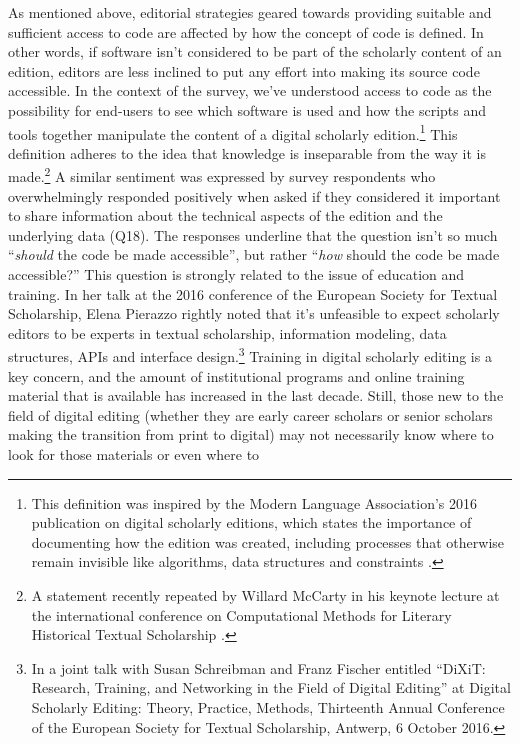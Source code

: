 \begin{paper}
As mentioned above, editorial strategies geared towards providing
suitable and sufficient access to code are affected by how the concept
of code is defined. In other words, if software isn't considered to be
part of the scholarly content of an edition, editors are less inclined
to put any effort into making its source code accessible. In the context
of the survey, we've understood access to code as the possibility for
end-users to see which software is used and how the scripts and tools
together manipulate the content of a digital scholarly
edition.\footnote{This definition was inspired by the Modern Language
  Association's 2016 publication on digital scholarly editions, which
  states the importance of documenting how the edition was created,
  including processes that otherwise remain invisible like algorithms,
  data structures and constraints \citep[7]{mla_modern_2016}.} This definition
adheres to the idea that knowledge is inseparable from the way it is
made.\footnote{A statement recently repeated by Willard McCarty in his
  keynote lecture at the international conference on Computational
  Methods for Literary Historical Textual Scholarship \citep{mccarty_what_2018}.} A similar sentiment was expressed by survey
respondents who overwhelmingly responded positively when asked if they
considered it important to share information about the technical aspects
of the edition and the underlying data (Q18). The responses underline
that the question isn't so much ``\emph{should} the code be made
accessible'', but rather ``\emph{how} should the code be made accessible?'' This question is strongly related
to the issue of education and training. In her talk at the 2016
conference of the European Society for Textual Scholarship, Elena
Pierazzo rightly noted that it's unfeasible to expect scholarly editors
to be experts in textual scholarship, information modeling, data
structures, APIs and interface design.\footnote{In a joint talk with
  Susan Schreibman and Franz Fischer entitled ``DiXiT: Research,
  Training, and Networking in the Field of Digital Editing'' at Digital
  Scholarly Editing: Theory, Practice, Methods, Thirteenth Annual
  Conference of the European Society for Textual Scholarship, Antwerp, 6
  October 2016.} Training in digital scholarly editing is a key concern,
and the amount of institutional programs and online training material
that is available has increased in the last decade. Still, those new to
the field of digital editing (whether they are early career scholars or
senior scholars making the transition from print to digital) may not
necessarily know where to look for those materials or even where to

\end{paper}
